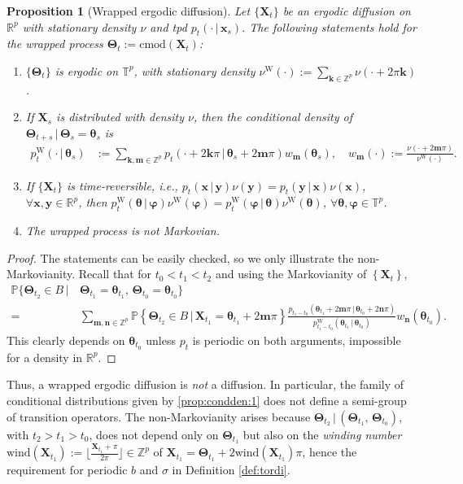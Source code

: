 \documentclass[oneside,11pt]{article}
\newcommand{\lb}{\left\{}
\newcommand{\rb}{\right\}}
\newcommand{\R}{\mathbb{R}}
\newcommand{\T}{\mathbb{T}}
\newcommand{\Z}{\mathbb{Z}}
\newcommand{\bx}{\mathbf{x}}
\newcommand{\bm}{\mathbf{m}}
\newcommand{\bn}{\mathbf{n}}
\newcommand{\by}{\mathbf{y}}
\newcommand{\bX}{\mathbf{X}}
\newcommand{\bk}{\mathbf{k}}
\newcommand{\bphi}{\boldsymbol\varphi}
\newcommand{\btheta}{\boldsymbol\theta}
\newcommand{\bTheta}{\boldsymbol\Theta}
\newcommand{\lrb}[1]{\left\{#1\right\}}
\newcommand{\Prob}[1]{\mathbb{P}\lb #1\rb}
\newcommand{\cmod}[1]{\mathrm{cmod}\left(#1\right)}
\newtheorem{prop}{Proposition}
\begin{document}
\begin{prop}[Wrapped ergodic diffusion]
\label{prop:condden}
Let $\{\bX_t\}$ be an ergodic diffusion on $\R^p$ with stationary density $\nu$ and tpd $p_t(\cdot\, | \,\bx_s)$. The following statements hold for the wrapped process $\bTheta_t:=\cmod{\bX_t}$:
\begin{enumerate}[label=\textit{\roman*.}, ref=\textit{\roman*}]
\item $\{\bTheta_t\}$ is ergodic on $\T^p$, with stationary density
$\nu^{\mathrm{W}}(\cdot):=\sum_{\bk\in\Z^p} \nu (\cdot+2\pi\bk)$.
\item If $\bX_s$ is distributed with density $\nu$, then the conditional density of $\bTheta_{t+s}\,|\,\bTheta_s=\btheta_s$ is
\begin{align}
p^{\mathrm{W}}_t(\cdot \, | \, \btheta_s) &:= \sum_{\bk,\bm\in\Z^p} p_t(\cdot + 2\bk\pi  \, | \, \btheta_s + 2\bm\pi )w_{\bm}(\btheta_s),\quad w_{\bm}(\cdot):=\frac{\nu(\cdot+2\bm\pi )}{\nu^{\mathrm{W}}(\cdot)}.\label{prop:condden:1}
\end{align}
\item If $\{\bX_t\}$ is time-reversible, \textit{i.e.}, $p_t(\bx\,|\,\by)\nu(\by)=p_t(\by\,|\,\bx)\allowbreak \nu(\bx)$, $\forall\bx,\by\in\R^p$, then $p^{\mathrm{W}}_t(\btheta\,|\,\bphi)\nu^{\mathrm{W}}(\bphi)=p_t^{\mathrm{W}}(\bphi\,|\,\btheta)\allowbreak \nu^{\mathrm{W}}(\btheta)$, $\forall\btheta,\bphi\in\T^p$.
\item The wrapped process is \emph{not} Markovian.
\end{enumerate}
\end{prop}
\begin{proof}
The statements can be easily checked, so we only illustrate the non-Markovianity. Recall that for $t_0<t_1<t_2$ and using the Markovianity of $\lrb{\bX_t}$,
\begin{align*}
\mathbb{P}\{\bTheta_{t_2}\in B \, | &\, \bTheta_{t_1} = \btheta_{t_1}, \, \bTheta_{t_0} =
\btheta_{t_0}\} \\
=&\, \sum_{\bm,\bn\in\Z^p} \Prob{\bTheta_{t_2}\in B \, | \, \bX_{t_1} = \btheta_{t_1} +
	2\bm\pi } \frac{p_{t_1-t_0}(\btheta_{t_1}+2\bm\pi  \, | \, \btheta_{t_0} + 2\bn\pi )}{p^{\mathrm{W}}_{t_1-t_0}(\btheta_{t_1} \, | \, \btheta_{t_0})}w_{\bn}(\btheta_{t_0}).
\end{align*}
This clearly depends on $\btheta_{t_0}$ unless $p_t$ is periodic on both arguments, impossible for a density in $\R^p$.
\end{proof}

Thus, a wrapped ergodic diffusion is \emph{not} a diffusion. In particular, the family of conditional distributions given by \eqref{prop:condden:1} does not define a semi-group of transition operators. The non-Markovianity arises because $\bTheta_{t_2}\,|\,(\bTheta_{t_1}, \,\allowbreak \bTheta_{t_0})$, with $t_2>t_1>t_0$, does not depend only on $\bTheta_{t_1}$ but also on the \emph{winding number} $\mathrm{wind}(\bX_{t_1})\allowbreak:=\lfloor\frac{\bX_{t_1}+\pi}{2\pi}\rfloor\in\Z^p$ of $\bX_{t_1}=\bTheta_{t_1}+2\mathrm{wind}(\bX_{t_1})\pi$, hence the requirement for periodic $b$ and $\sigma$ in Definition \ref{def:tordi}.
\end{document}
